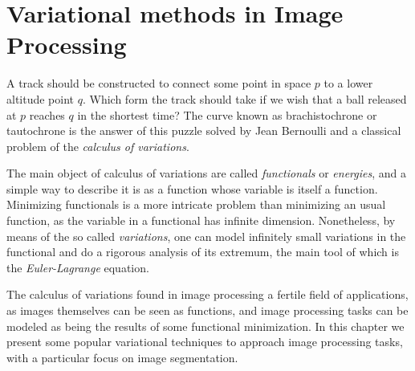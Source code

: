 \chapter{Variational methods in Image Processing}
\label{chapter:variational-methods-in-image-processing}

A track should be constructed to connect some point in space $p$ to a lower altitude point $q$. Which form the track should take if we wish that a ball released at $p$ reaches $q$ in the shortest time? The curve known as brachistochrone or tautochrone is the answer of this puzzle solved by Jean Bernoulli and a classical problem of the \emph{calculus of variations}. 

The main object of calculus of variations are called \emph{functionals} or \emph{energies}, and a simple way to describe it is as a function whose variable is itself a function. Minimizing functionals is a more intricate problem than minimizing an usual function, as the variable in a functional has infinite dimension. Nonetheless, by means of the so called \emph{variations}, one can model infinitely small variations in the functional and do a rigorous analysis of its extremum, the main tool of which is the \emph{Euler-Lagrange} equation.

The calculus of variations found in image processing a fertile field of applications, as images themselves can be seen as functions, and image processing tasks can be modeled as being the results of some functional minimization. In this chapter we present some popular variational techniques to approach image processing tasks, with a particular focus on image segmentation. 


